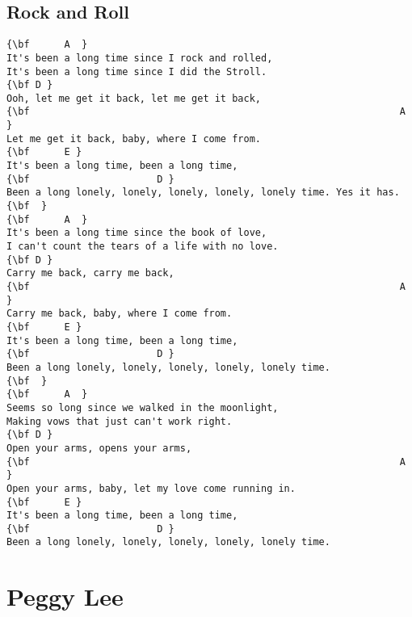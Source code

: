 \documentclass[a4paper]{article}
\begin{document}
\subsection{Rock and Roll} %
\label{sub:Rock and Roll}
\begin{Verbatim}[commandchars=\\\{\}]
{\bf      A  }
It's been a long time since I rock and rolled,  
It's been a long time since I did the Stroll.  
{\bf D }
Ooh, let me get it back, let me get it back,  
{\bf                                                                A }
Let me get it back, baby, where I come from.  
{\bf      E }
It's been a long time, been a long time,  
{\bf                      D }
Been a long lonely, lonely, lonely, lonely, lonely time. Yes it has.  
{\bf  }
{\bf      A  }
It's been a long time since the book of love,  
I can't count the tears of a life with no love.  
{\bf D }
Carry me back, carry me back,  
{\bf                                                                A }
Carry me back, baby, where I come from.  
{\bf      E }
It's been a long time, been a long time,  
{\bf                      D }
Been a long lonely, lonely, lonely, lonely, lonely time.  
{\bf  }
{\bf      A  }
Seems so long since we walked in the moonlight,  
Making vows that just can't work right.  
{\bf D }
Open your arms, opens your arms,  
{\bf                                                                A }
Open your arms, baby, let my love come running in.  
{\bf      E }
It's been a long time, been a long time,  
{\bf                      D }
Been a long lonely, lonely, lonely, lonely, lonely time. 
\end{Verbatim}
\newpage
\section{Peggy Lee} %
\label{sec:Peggy Lee}
\end{document}
